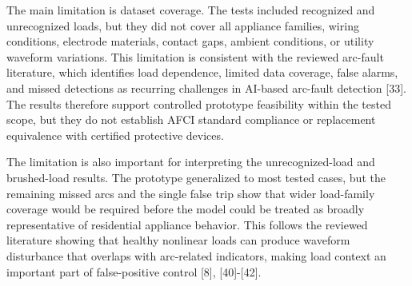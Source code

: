 The main limitation is dataset coverage. The tests included recognized and
unrecognized loads, but they did not cover all appliance families, wiring
conditions, electrode materials, contact gaps, ambient conditions, or utility
waveform variations. This limitation is consistent with the reviewed arc-fault
literature, which identifies load dependence, limited data coverage, false
alarms, and missed detections as recurring challenges in AI-based arc-fault
detection [33]. The results therefore support controlled prototype feasibility
within the tested scope, but they do not establish AFCI standard compliance or
replacement equivalence with certified protective devices.

The limitation is also important for interpreting the unrecognized-load and
brushed-load results. The prototype generalized to most tested cases, but the
remaining missed arcs and the single false trip show that wider load-family
coverage would be required before the model could be treated as broadly
representative of residential appliance behavior. This follows the reviewed
literature showing that healthy nonlinear loads can produce waveform
disturbance that overlaps with arc-related indicators, making load context an
important part of false-positive control [8], [40]-[42].